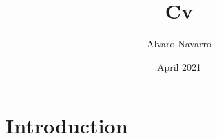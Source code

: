 \documentclass{article}
\title{Cv}
\author{Alvaro Navarro}
\date{April 2021}
\begin{document}
\maketitle

\section{Introduction}
\end{document}
